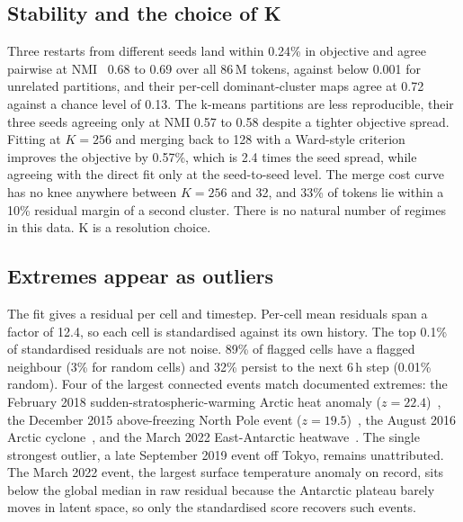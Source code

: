 \documentclass[10pt,twocolumn]{article}
\newcommand{\nmitok}{0.68 to 0.69}      %
\newcommand{\nmimap}{0.72}              %
\newcommand{\nmimapchance}{0.13}        %
\newcommand{\cellspan}{12.4}            %
\begin{document}
\subsection{Stability and the choice of K}
Three restarts from different seeds land within 0.24\% in objective and agree
pairwise at NMI~\cite{nmi} \nmitok{} over all 86\,M tokens, against below
0.001 for unrelated partitions, and their per-cell dominant-cluster maps agree
at \nmimap{} against a chance level of \nmimapchance{}. The k-means partitions
are less reproducible, their three seeds agreeing only at NMI 0.57 to 0.58
despite a tighter objective spread. Fitting at $K{=}256$ and
merging back to 128 with a Ward-style criterion~\cite{ward,merge} improves the objective by
0.57\%, which is 2.4 times the seed spread, while agreeing with the direct fit
only at the seed-to-seed level. The merge cost curve has no knee anywhere
between $K{=}256$ and 32, and 33\% of tokens lie within a 10\% residual margin
of a second cluster. There is no natural number of regimes in this data. K is
a resolution choice.

\subsection{Extremes appear as outliers}
The fit gives a residual per cell and timestep. Per-cell mean residuals span
a factor of \cellspan{}, so each cell is standardised against its own history. The top 0.1\% of standardised
residuals are not noise. 89\% of flagged cells have a flagged neighbour (3\%
for random cells) and 32\% persist to the next 6\,h step (0.01\% random).
Four of the largest connected events match documented extremes: the February
2018 sudden-stratospheric-warming Arctic heat anomaly ($z{=}22.4$)~\cite{ssw2018}, the
December 2015 above-freezing North Pole event ($z{=}19.5$)~\cite{np2015}, the August 2016
Arctic cyclone~\cite{seaice2016}, and the March 2022 East-Antarctic
heatwave~\cite{wille2024,bw2023}. The single
strongest outlier, a late September 2019 event off Tokyo, remains
unattributed.
The March 2022 event, the largest surface temperature anomaly on record, sits
below the global median in raw residual because the Antarctic plateau barely
moves in latent space, so only the standardised score recovers such events.
\end{document}
